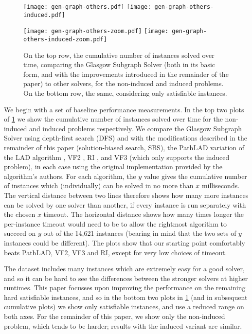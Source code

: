 \documentclass[runningheads]{llncs}
\begin{document}
\begin{figure}[tb]
    \texttt{[image: gen-graph-others.pdf]}
    \hfill
    \texttt{[image: gen-graph-others-induced.pdf]}

    \bigskip

    \texttt{[image: gen-graph-others-zoom.pdf]}
    \hfill
    \texttt{[image: gen-graph-others-induced-zoom.pdf]}

    \caption{On the top row, the cumulative number of instances solved over time, comparing the
    Glasgow Subgraph Solver (both in its basic form, and with the improvements introduced in the
    remainder of the paper) to other solvers, for the non-induced and induced problems. On the
    bottom row, the same, considering only satisfiable instances.}
    \label{figure:others}
\end{figure}

We begin with a set of baseline performance measurements. In the top
two plots of \cref{figure:others} we show the cumulative number of instances solved over time for the
non-induced and induced problems respectively. We compare the Glasgow Subgraph Solver using
depth-first search (DFS) and with the modifications described in the remainder of this paper
(solution-biased search, SBS), the PathLAD variation of the LAD algorithm
\cite{DBLP:journals/ai/Solnon10,DBLP:conf/lion/KotthoffMS16}, VF2
\cite{DBLP:journals/pami/CordellaFSV04}, RI \cite{DBLP:journals/bmcbi/BonniciGPSF13}, and VF3
\cite{DBLP:conf/gbrpr/CarlettiFSV17} (which only supports the induced problem), in each case using
the original implementation provided by the algorithm's authors. For each algorithm, the $y$ value
gives the cumulative number of instances which (individually) can be solved in no more than $x$
milliseconds.  The vertical distance between two lines therefore shows how many more instances can
be solved by one solver than another, if every instance is run separately with the chosen $x$
timeout. The horizontal distance shows how many times longer the per-instance timeout would need to
be to allow the rightmost algorithm to succeed on $y$ out of the 14,621 instances (bearing in mind
that the two sets of $y$ instances could be different).  The plots show that our starting point
comfortably beats PathLAD, VF2, VF3 and RI, except for very low choices of timeout.

The dataset includes many instances which are extremely easy for a good solver, and so it can be
hard to see the differences between the stronger solvers at higher runtimes. This paper focusses
upon improving the performance on the remaining hard satisfiable instances, and so in the bottom two
plots in \cref{figure:others} (and in subsequent cumulative plots) we show only satisfiable
instances, and use a reduced range on both axes.  For the remainder of this paper, we show only the
non-induced problem, which tends to be harder; results with the induced variant are similar.
\end{document}

